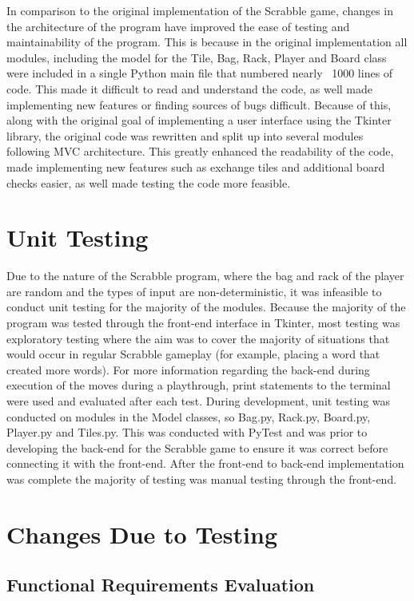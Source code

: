 \documentclass[12pt, titlepage]{article}
\begin{document}
In comparison to the original implementation of the Scrabble game, changes in the architecture of the program have improved the ease of testing and maintainability of the program. This is because in the original implementation all modules, including the model for the Tile, Bag, Rack, Player and Board class were included in a single Python main file that numbered nearly ~1000 lines of code. This made it difficult to read and understand the code, as well made implementing new features or finding sources of bugs difficult. Because of this, along with the original goal of implementing a user interface using the Tkinter library, the original code was rewritten and split up into several modules following MVC architecture. This greatly enhanced the readability of the code, made implementing new features such as exchange tiles and additional board checks easier, as well made testing the code more feasible. 

\section{Unit Testing}

Due to the nature of the Scrabble program, where the bag and rack of the player are random and the types of input are non-deterministic, it was infeasible to conduct unit testing for the majority of the modules. Because the majority of the program was tested through the front-end interface in Tkinter, most testing was exploratory testing where the aim was to cover the majority of situations that would occur in regular Scrabble gameplay (for example, placing a word that created more words). For more information regarding the back-end during execution of the moves during a playthrough, print statements to the terminal were used and evaluated after each test. During development, unit testing was conducted on modules in the Model classes, so Bag.py, Rack.py, Board.py, Player.py and Tiles.py. This was conducted with PyTest and was prior to developing the back-end for the Scrabble game to ensure it was correct before connecting it with the front-end. After the front-end to back-end implementation was complete the majority of testing was manual testing through the front-end.

\section{Changes Due to Testing}

\subsection{Functional Requirements Evaluation}
\end{document}
